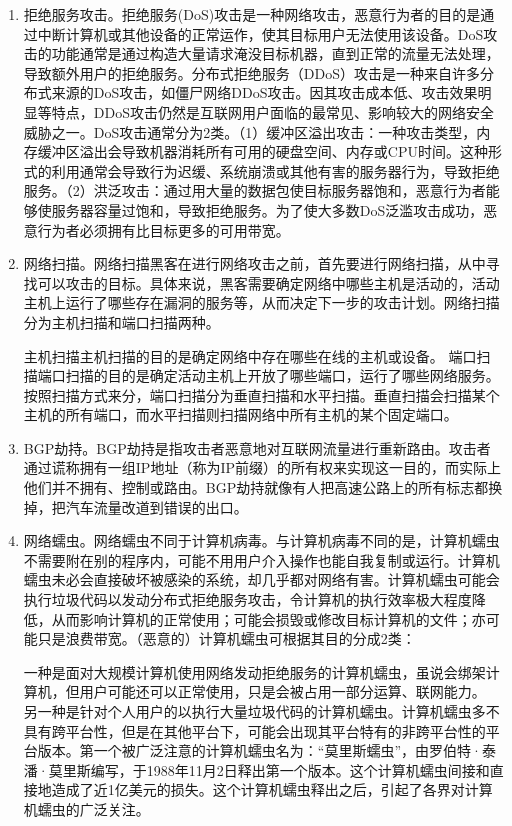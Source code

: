 \begin{enumerate}
    \item 拒绝服务攻击。拒绝服务(DoS)攻击是一种网络攻击，恶意行为者的目的是通过中断计算机或其他设备的正常运作，使其目标用户无法使用该设备。DoS攻击的功能通常是通过构造大量请求淹没目标机器，直到正常的流量无法处理，导致额外用户的拒绝服务。分布式拒绝服务（DDoS）攻击是一种来自许多分布式来源的DoS攻击，如僵尸网络DDoS攻击。因其攻击成本低、攻击效果明显等特点，DDoS攻击仍然是互联网用户面临的最常见、影响较大的网络安全威胁之一。DoS攻击通常分为2类。（1）缓冲区溢出攻击：一种攻击类型，内存缓冲区溢出会导致机器消耗所有可用的硬盘空间、内存或CPU时间。这种形式的利用通常会导致行为迟缓、系统崩溃或其他有害的服务器行为，导致拒绝服务。（2）洪泛攻击：通过用大量的数据包使目标服务器饱和，恶意行为者能够使服务器容量过饱和，导致拒绝服务。为了使大多数DoS泛滥攻击成功，恶意行为者必须拥有比目标更多的可用带宽。

    \item 网络扫描。网络扫描黑客在进行网络攻击之前，首先要进行网络扫描，从中寻找可以攻击的目标。具体来说，黑客需要确定网络中哪些主机是活动的，活动主机上运行了哪些存在漏洞的服务等，从而决定下一步的攻击计划。网络扫描分为主机扫描和端口扫描两种。

    主机扫描主机扫描的目的是确定网络中存在哪些在线的主机或设备。
    端口扫描端口扫描的目的是确定活动主机上开放了哪些端口，运行了哪些网络服务。按照扫描方式来分，端口扫描分为垂直扫描和水平扫描。垂直扫描会扫描某个主机的所有端口，而水平扫描则扫描网络中所有主机的某个固定端口。

    \item BGP劫持。BGP劫持是指攻击者恶意地对互联网流量进行重新路由。攻击者通过谎称拥有一组IP地址（称为IP前缀）的所有权来实现这一目的，而实际上他们并不拥有、控制或路由。BGP劫持就像有人把高速公路上的所有标志都换掉，把汽车流量改道到错误的出口。
    
    \item 网络蠕虫。网络蠕虫不同于计算机病毒。与计算机病毒不同的是，计算机蠕虫不需要附在别的程序内，可能不用用户介入操作也能自我复制或运行。计算机蠕虫未必会直接破坏被感染的系统，却几乎都对网络有害。计算机蠕虫可能会执行垃圾代码以发动分布式拒绝服务攻击，令计算机的执行效率极大程度降低，从而影响计算机的正常使用；可能会损毁或修改目标计算机的文件；亦可能只是浪费带宽。（恶意的）计算机蠕虫可根据其目的分成2类：

    一种是面对大规模计算机使用网络发动拒绝服务的计算机蠕虫，虽说会绑架计算机，但用户可能还可以正常使用，只是会被占用一部分运算、联网能力。
    另一种是针对个人用户的以执行大量垃圾代码的计算机蠕虫。计算机蠕虫多不具有跨平台性，但是在其他平台下，可能会出现其平台特有的非跨平台性的平台版本。第一个被广泛注意的计算机蠕虫名为：“莫里斯蠕虫”，由罗伯特·泰潘·莫里斯编写，于1988年11月2日释出第一个版本。这个计算机蠕虫间接和直接地造成了近1亿美元的损失。这个计算机蠕虫释出之后，引起了各界对计算机蠕虫的广泛关注。


\end{enumerate}
